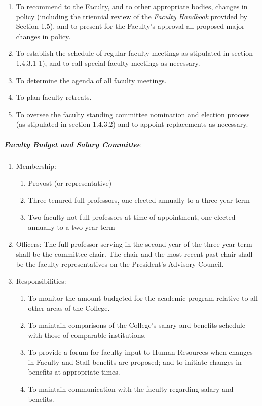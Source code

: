 \documentclass[letterpaper, 11pt]{article}
\begin{document}
\begin{enumerate}[label=\alph*)]
{\begin{enumerate}[label=\arabic*)]
								\item{To recommend to the Faculty, and to other appropriate bodies, changes in policy (including the triennial review of the \emph{Faculty Handbook} provided by Section 1.5), and to present for the Faculty's approval all proposed major changes in policy.}
								\item{To establish the schedule of regular faculty meetings as stipulated in section 1.4.3.1 1), and to call special faculty meetings as necessary.}
								\item{To determine the agenda of all faculty meetings.}
								\item{To plan faculty retreats.}
								\item{To oversee the faculty standing committee nomination and election process (as stipulated in section 1.4.3.2)  and to appoint replacements as necessary.}
							\end{enumerate}
						}
					\end{enumerate}
				\subparagraph{  Faculty Budget and Salary Committee}
					\begin{enumerate}[label=\alph*)]
						\item{Membership:
							\begin{enumerate}[label=\arabic*)]
								\item{Provost (or representative)}
								\item{Three tenured full professors, one elected annually to a three-year term}
								\item{Two faculty not full professors at time of appointment, one elected annually to a two-year term}
							\end{enumerate}
						}
						\item{Officers:
							The full professor serving in the second year of the three-year term shall be the committee chair.  The chair and the most recent past chair shall be the faculty representatives on the President's Advisory Council.
						}
						\item{Responsibilities:
							\begin{enumerate}[label=\arabic*)]
								\item{To monitor the amount budgeted for the academic program relative to all other areas of the College.}
								\item{To maintain comparisons of the College's salary and benefits schedule with those of comparable institutions.}
								\item{To provide a forum for faculty input to Human Resources when changes in Faculty and Staff benefits are proposed; and to initiate changes in benefits at appropriate times.}
								\item{To maintain communication with the faculty regarding salary and benefits.}
							\end{enumerate}
						}
					\end{enumerate}
\end{document}
